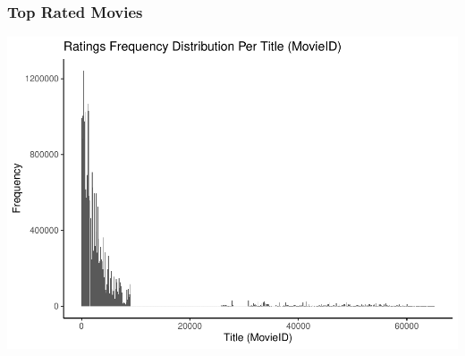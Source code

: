 \documentclass[
]{article}
\begin{document}
\hypertarget{top-rated-movies}{%
\subsubsection{Top Rated Movies}\label{top-rated-movies}}

\begin{center}\includegraphics{MovieLens-Project-Report_files/figure-latex/unnamed-chunk-19-1} \end{center}
\end{document}
